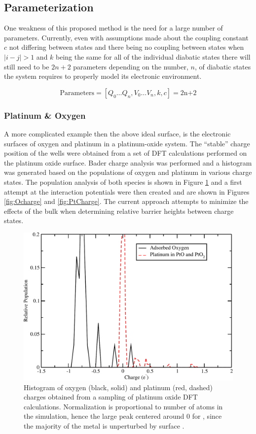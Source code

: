 \subsection{Parameterization}
One weakness of this proposed method is the need for a large number of
parameters.  Currently, even with assumptions made about the coupling constant
$c$ not differing between states and there being no coupling between states
when $|i-j| > 1$  and $k$ being the same for all of the individual diabatic
states there will still need to be $2n+2$ parameters depending on the number, $n$, of
diabatic states the system requires to properly model its electronic
environment.

\begin{equation*}
\text{Parameters} = [Q_0 \dots Q_n, V_0 \dots V_n, k, c] = \text{2n+2}
\end{equation*}

\subsubsection{Platinum \& Oxygen}
A more complicated example then the above ideal surface, is the electronic surfaces
of oxygen and platinum in a platinum-oxide system.  The ``stable'' charge
position of the wells were obtained from a set of DFT calculations performed on
the platinum oxide surface. Bader charge analysis was performed and a histogram
was generated based on the populations of oxygen and platinum in various charge
states. The population analysis of both species is shown in Figure
\ref{fig:population} and a first attempt at the interaction potentials were
then created and are shown in Figures \ref{fig:Ocharge} and \ref{fig:PtCharge}.
The current approach attempts to minimize the effects of the bulk  when
determining relative barrier heights between charge states.

\begin{figure}
  \centering
  \includegraphics[width=0.75\linewidth]{../figures/chap5/chgDist_PtO.pdf}
  \caption{Histogram of oxygen (black, solid) and platinum (red, dashed)
charges obtained from a sampling of platinum oxide DFT calculations.
Normalization is proportional to number of atoms in the simulation, hence the
large peak centered around 0 for , since the majority of the metal is
unperturbed by surface .}
\label{fig:population}
\end{figure}

